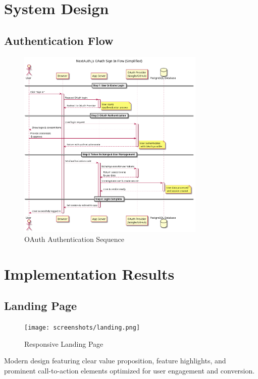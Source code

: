 \section{System Design}

\subsection{Authentication Flow}
\begin{figure}[H]
    \centering
    \includegraphics[width=0.8\textwidth]{conception/SprintII/sequence_diagrams/sequence_authentication_1_1_AuthenticateUsingGoogleAccount.png}
    \caption{OAuth Authentication Sequence}
    \label{fig:seq_google_auth}
\end{figure}


\section{Implementation Results}

\subsection{Landing Page}
\begin{figure}[H]
    \centering
    \texttt{[image: screenshots/landing.png]}
    \caption{Responsive Landing Page}
    \label{fig:landing_page}
\end{figure}

Modern design featuring clear value proposition, feature highlights, and prominent call-to-action elements optimized for user engagement and conversion.

